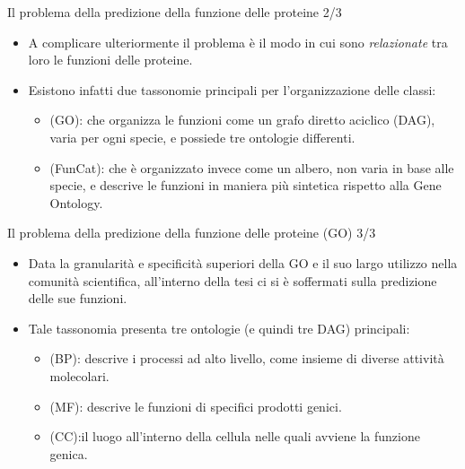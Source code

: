 \documentclass{beamer}
\begin{document}
\begin{tframe}{\small Il problema della predizione della funzione delle proteine 2/3}
\begin{itemize}
\item A complicare ulteriormente il problema è il modo in cui sono \emph{relazionate} tra loro le funzioni delle proteine.
\item Esistono infatti due tassonomie principali per l'organizzazione delle classi:
\begin{itemize}

\item {} (GO):  che organizza le funzioni come un grafo diretto aciclico (DAG), varia per ogni specie, e possiede tre ontologie differenti.
\item {} (FunCat): che è organizzato invece come un albero, non varia in base alle specie, e descrive le funzioni in maniera più sintetica rispetto alla Gene Ontology.
\end{itemize}
\end{itemize}  

\end{tframe}

\begin{tframe}{\small Il problema della predizione della funzione delle proteine (GO) 3/3}
\begin{itemize}
\item Data la granularità e specificità superiori della GO e il suo largo utilizzo nella comunità scientifica, all’interno della tesi ci si è soffermati sulla predizione delle sue funzioni.
\item Tale tassonomia presenta tre ontologie (e quindi tre DAG) principali:
\begin{itemize}
\item {} (BP): descrive i processi ad alto livello, come insieme di diverse attività molecolari.
\item {} (MF): descrive le funzioni di specifici prodotti genici.
\item {} (CC):il luogo all’interno della cellula nelle quali avviene la funzione genica.
\end{itemize}
\end{itemize}  

\end{tframe}
\end{document}
